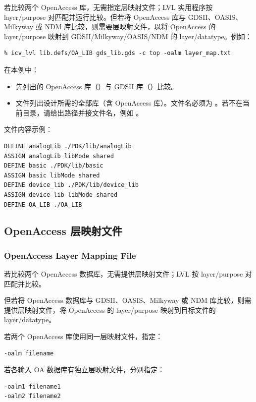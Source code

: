 若比较两个 OpenAccess 库，无需指定层映射文件；LVL 实用程序按 layer/purpose 对匹配并运行比较。但若将 OpenAccess 库与 GDSII、OASIS、Milkyway 或 NDM 库比较，则需要层映射文件，以将 OpenAccess 的 layer/purpose 映射到 GDSII/Milkyway/OASIS/NDM 的 layer/datatype。例如：

\begin{lstlisting}
% icv_lvl lib.defs/OA_LIB gds_lib.gds -c top -oalm layer_map.txt
\end{lstlisting}

在本例中：
\begin{itemize}
  \item 先列出的 OpenAccess 库（）与 GDSII 库（）比较。
  \item {} 文件列出设计所需的全部库（含 OpenAccess 库）。文件名必须为 。若不在当前目录，请给出路径并接文件名，例如 。
\end{itemize}

 文件内容示例：
\begin{lstlisting}
DEFINE analogLib ./PDK/lib/analogLib
ASSIGN analogLib libMode shared
DEFINE basic ./PDK/lib/basic
ASSIGN basic libMode shared
DEFINE device_lib ./PDK/lib/device_lib
ASSIGN device_lib libMode shared
DEFINE OA_LIB ./OA_LIB
\end{lstlisting}

\subsection{OpenAccess 层映射文件}
\subsubsection*{OpenAccess Layer Mapping File}

若比较两个 OpenAccess 数据库，无需提供层映射文件；LVL 按 layer/purpose 对匹配并比较。

但若将 OpenAccess 数据库与 GDSII、OASIS、Milkyway 或 NDM 库比较，则需提供层映射文件，将 OpenAccess 的 layer/purpose 映射到目标文件的 layer/datatype。

若两个 OpenAccess 库使用同一层映射文件，指定：
\begin{lstlisting}
-oalm filename
\end{lstlisting}

若各输入 OA 数据库有独立层映射文件，分别指定：
\begin{lstlisting}
-oalm1 filename1
-oalm2 filename2
\end{lstlisting}

